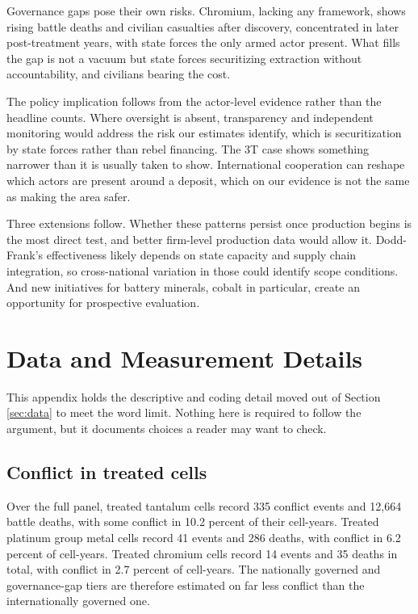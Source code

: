 \documentclass[11pt]{article}
\begin{document}
Governance gaps pose their own risks. Chromium, lacking any framework, shows rising battle deaths and civilian casualties after discovery, concentrated in later post-treatment years, with state forces the only armed actor present. What fills the gap is not a vacuum but state forces securitizing extraction without accountability, and civilians bearing the cost.

The policy implication follows from the actor-level evidence rather than the headline counts. Where oversight is absent, transparency and independent monitoring would address the risk our estimates identify, which is securitization by state forces rather than rebel financing. The 3T case shows something narrower than it is usually taken to show. International cooperation can reshape which actors are present around a deposit, which on our evidence is not the same as making the area safer.

Three extensions follow. Whether these patterns persist once production begins is the most direct test, and better firm-level production data would allow it. Dodd-Frank's effectiveness likely depends on state capacity and supply chain integration, so cross-national variation in those could identify scope conditions. And new initiatives for battery minerals, cobalt in particular, create an opportunity for prospective evaluation.



\clearpage
\appendix
\renewcommand{\thetable}{\thesection\arabic{table}}
\renewcommand{\thefigure}{\thesection\arabic{figure}}
\setcounter{table}{0}
\setcounter{figure}{0}

\section{Data and Measurement Details}
\label{sec:datadetail}

This appendix holds the descriptive and coding detail moved out of Section
\ref{sec:data} to meet the word limit. Nothing here is required to follow the
argument, but it documents choices a reader may want to check.

\subsection*{Conflict in treated cells}

Over the full panel, treated tantalum cells record 335 conflict events and
12,664 battle deaths, with some conflict in 10.2 percent of their cell-years.
Treated platinum group metal cells record 41 events and 286 deaths, with
conflict in 6.2 percent of cell-years. Treated chromium cells record 14 events
and 35 deaths in total, with conflict in 2.7 percent of cell-years. The
nationally governed and governance-gap tiers are therefore estimated on far less
conflict than the internationally governed one.
\end{document}
